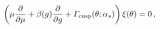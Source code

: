 \begin{equation}
\left(
\mu \frac{\partial}{\partial\mu}
+
\beta (g) \frac{\partial}{\partial g}
+ {\mit\Gamma}_{\rm cusp} (\theta; \alpha_s)
\right) \xi ( \theta ) = 0 \, ,
\label{RG}
\end{equation}

